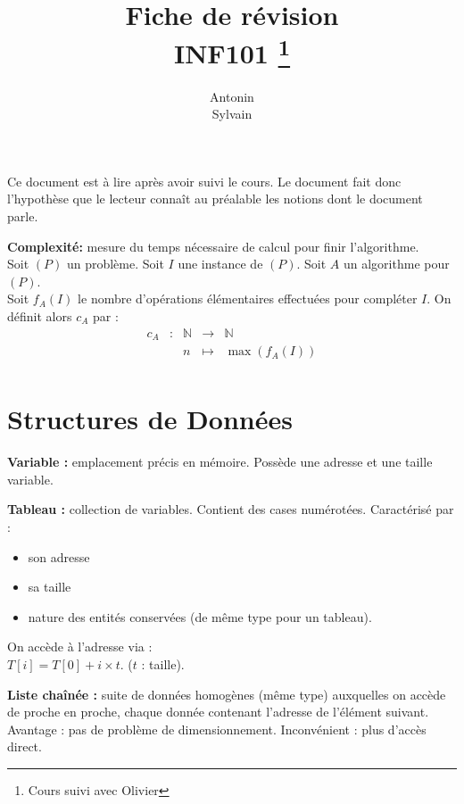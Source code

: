 \documentclass[a4paper, 8pt]{article}
\title{\sffamily\textbf{Fiche de révision \\ INF101} \thanks{Cours suivi avec Olivier \bsc{Hudry} }}
\author{Antonin \bsc{Godard}\\Sylvain \bsc{Rager}}
\date{}
\begin{document}
\renewcommand{\labelitemii}{$\bullet$}

\begin{multicols*}{3}
\setlength{\parindent}{0pt}
\maketitle

\begin{changemargin}{0.5cm}{0.5cm} 
{\footnotesize Ce document est à lire après avoir suivi le cours. Le document fait donc l'hypothèse que le lecteur connaît au préalable les notions dont le document parle.}
\end{changemargin}


\textbf{Complexité:} mesure du temps nécessaire de calcul pour finir l'algorithme.\\ Soit $(P)$ un problème. Soit $I$ une instance de $(P)$. Soit $A$ un algorithme pour $(P)$.\\ Soit $f_A(I)$ le nombre d'opérations élémentaires effectuées pour compléter $I$. On définit alors $c_A$ par :
\[
\begin{array}{cc|ccl}
c_A & : & \mathbb{N} & \to & \mathbb{N} \\
 & & n & \mapsto & \max(f_A(I)) \\
\end{array}
\]

\section*{Structures de Données}

\textbf{Variable :} emplacement précis en mémoire. Possède une adresse et une taille variable.

\textbf{Tableau :} collection de variables. Contient des cases numérotées. Caractérisé par :\begin{itemize}
\item son adresse
\item sa taille
\item nature des entités conservées (de même type pour un tableau).
\end{itemize}
On accède à l'adresse via :\\ $ T\left[ i\right] = T\left[ 0\right] + i\times t $. ($t$ : taille).

\textbf{Liste chaînée :} suite de données homogènes (même type) auxquelles on accède de proche en proche, chaque donnée contenant l'adresse de l'élément suivant. Avantage : pas de problème de dimensionnement. Inconvénient : plus d'accès direct.


\end{multicols*}
\end{document}
